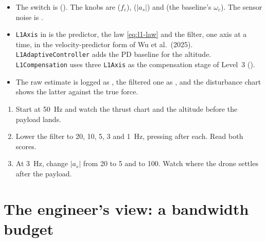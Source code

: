 
\begin{inapp}
\begin{itemize}[leftmargin=1.2em]
  \item The switch is  (). The knobs are  ($f_c$),  ($|a_s|$) and  (the baseline's $\omega_c$). The sensor noise is .
  \item \texttt{L1Axis} in  is the predictor, the law \cref{eq:l1-law} and the filter, one axis at a time, in the velocity-predictor form of Wu et al.\ (2025). \texttt{L1AdaptiveController} adds the PD baseline for the altitude. \texttt{L1Compensation} uses three \texttt{L1Axis} as the compensation stage of Level~3 ().
  \item The raw estimate is logged as , the filtered one as , and the disturbance chart shows the latter against the true force.
\end{itemize}
\end{inapp}

\begin{trythis}
\begin{enumerate}
  \item Start at \SI{50}{Hz} and watch the thrust chart and the altitude before the payload lands.
  \item Lower the filter to 20, 10, 5, 3 and \SI{1}{Hz}, pressing  after each. Read both scores.
  \item At \SI{3}{Hz}, change $|a_s|$ from 20 to 5 and to 100. Watch where the drone settles after the payload.
\end{enumerate}
\end{trythis}

\section{The engineer's view: a bandwidth budget}

